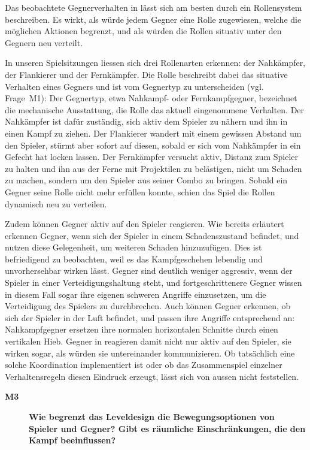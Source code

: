 \documentclass[../Main.tex]{subfiles}
\begin{document}
Das beobachtete Gegnerverhalten in  lässt sich am besten durch ein Rollensystem beschreiben. Es wirkt, als würde jedem Gegner eine Rolle zugewiesen, welche die möglichen Aktionen begrenzt, und als würden die Rollen situativ unter den Gegnern neu verteilt.

In unseren Spielsitzungen liessen sich drei Rollenarten erkennen: der Nahkämpfer, der Flankierer und der Fernkämpfer. Die Rolle beschreibt dabei das situative Verhalten eines Gegners und ist vom Gegnertyp zu unterscheiden (vgl. Frage~M1): Der Gegnertyp, etwa Nahkampf- oder Fernkampfgegner, bezeichnet die mechanische Ausstattung, die Rolle das aktuell eingenommene Verhalten. Der Nahkämpfer ist dafür zuständig, sich aktiv dem Spieler zu nähern und ihn in einen Kampf zu ziehen. Der Flankierer wandert mit einem gewissen Abstand um den Spieler, stürmt aber sofort auf diesen, sobald er sich vom Nahkämpfer in ein Gefecht hat locken lassen. Der Fernkämpfer versucht aktiv, Distanz zum Spieler zu halten und ihn aus der Ferne mit Projektilen zu belästigen, nicht um Schaden zu machen, sondern um den Spieler aus seiner Combo zu bringen. Sobald ein Gegner seine Rolle nicht mehr erfüllen konnte, schien das Spiel die Rollen dynamisch neu zu verteilen.

Zudem können Gegner aktiv auf den Spieler reagieren. Wie bereits erläutert erkennen Gegner, wenn sich der Spieler in einem Schadenszustand befindet, und nutzen diese Gelegenheit, um weiteren Schaden hinzuzufügen. Dies ist befriedigend zu beobachten, weil es das Kampfgeschehen lebendig und unvorhersehbar wirken lässt. Gegner sind deutlich weniger aggressiv, wenn der Spieler in einer Verteidigungshaltung steht, und fortgeschrittenere Gegner wissen in diesem Fall sogar ihre eigenen schweren Angriffe einzusetzen, um die Verteidigung des Spielers zu durchbrechen. Auch können Gegner erkennen, ob sich der Spieler in der Luft befindet, und passen ihre Angriffe entsprechend an: Nahkampfgegner ersetzen ihre normalen horizontalen Schnitte durch einen vertikalen Hieb. Gegner in  reagieren damit nicht nur aktiv auf den Spieler, sie wirken sogar, als würden sie untereinander kommunizieren. Ob tatsächlich eine solche Koordination implementiert ist oder ob das Zusammenspiel einzelner Verhaltensregeln diesen Eindruck erzeugt, lässt sich von aussen nicht feststellen.

\begin{description}
    \item[\textbf{M3}] \textbf{Wie begrenzt das Leveldesign die Bewegungsoptionen von Spieler und Gegner? Gibt es räumliche Einschränkungen, die den Kampf beeinflussen?}
\end{description}
\end{document}
